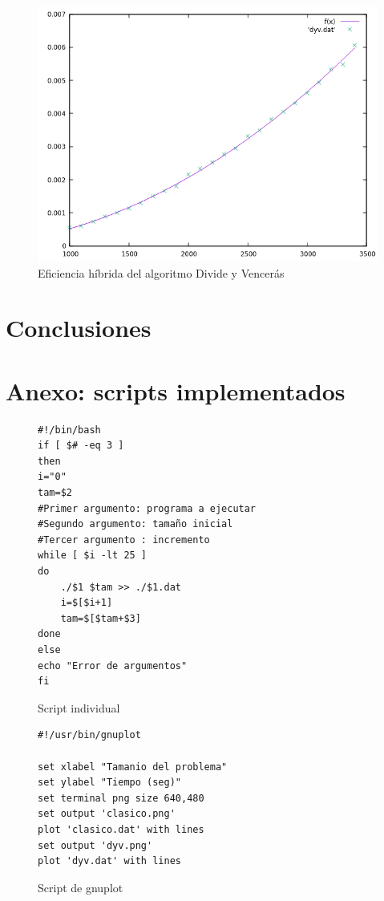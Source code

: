 \documentclass[12pt,spanish]{article}
\begin{document}
\begin{figure}[H]
\centering
\includegraphics[scale=0.75]{hibrida_dyv.png}
\caption{Eficiencia híbrida del algoritmo Divide y Vencerás}
\end{figure}


\section{Conclusiones}


\section{Anexo: scripts implementados}
\label{sec:scripts}

\begin{figure}[H]
\begin{verbatim}
#!/bin/bash
if [ $# -eq 3 ]
then
i="0"
tam=$2
#Primer argumento: programa a ejecutar
#Segundo argumento: tamaño inicial
#Tercer argumento : incremento
while [ $i -lt 25 ]
do
	./$1 $tam >> ./$1.dat
	i=$[$i+1]
	tam=$[$tam+$3]
done
else
echo "Error de argumentos"
fi

\end{verbatim}
\caption{Script individual}
\end{figure}



\begin{figure}[H]
\begin{verbatim}
#!/usr/bin/gnuplot

set xlabel "Tamanio del problema"
set ylabel "Tiempo (seg)"
set terminal png size 640,480
set output 'clasico.png'
plot 'clasico.dat' with lines
set output 'dyv.png'
plot 'dyv.dat' with lines
\end{verbatim}
\caption{Script de gnuplot}
\end{figure}
\end{document}
